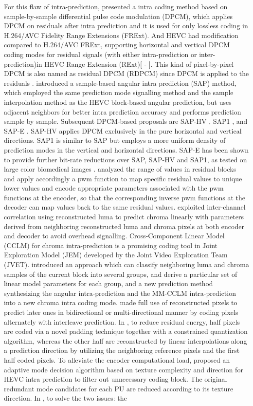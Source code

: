 \documentclass[journal]{IEEEtran}
\begin{document}
For this flaw of intra-prediction, \cite{d} presented a intra coding method based on sample-by-sample differential pulse code modulation (DPCM), which applies DPCM on residuals after intra prediction and it is used for only lossless coding in H.264/AVC Fidelity Range Extensions (FRExt). And HEVC had modification compared to H.264/AVC FRExt, supporting horizontal and vertical DPCM coding modes for residual signals (with either intra-prediction or inter-prediction)in HEVC Range Extension (RExt)[\cite{e} - \cite{h}]. This kind of pixel-by-pixel DPCM is also named as residual DPCM (RDPCM) since DPCM is applied to the residuals \cite{i}.
 \cite{09} introduced a sample-based angular intra prediction (SAP) method, which employed the same prediction mode signalling method and the sample interpolation method as the HEVC block-based angular prediction, but uses adjacent neighbors for better intra prediction accuracy and performs prediction sample by sample. Subsequent DPCM-based proposals are SAP-HV \cite{10}, SAP1 \cite{11}, and SAP-E \cite{12}. SAP-HV applies DPCM exclusively in the pure horizontal and vertical directions. SAP1 is similar to SAP but employs a more uniform density of prediction modes in the vertical and horizontal directions. SAP-E has been shown to provide further bit-rate reductions over SAP, SAP-HV and SAP1, as tested on large color biomedical images \cite{12}. \cite{13} analyzed the range of values in residual blocks and apply accordingly a pwm function to map specific residual values to unique lower values and encode appropriate parameters associated with the pwm functions at the encoder, so that the corresponding inverse pwm functions at the decoder can map values back to the same residual values. \cite{14} exploited inter-channel correlation using reconstructed luma to predict chroma linearly with parameters derived from neighboring reconstructed luma and chroma pixels at both encoder and decoder to avoid overhead signalling. Cross-Component Linear Model (CCLM) for chroma intra-prediction is a promising coding tool in Joint Exploration Model (JEM) developed by the Joint Video Exploration Team (JVET). \cite{15} introduced an approach which can classify neighboring luma and chroma samples of the current block into several groups, and derive a particular set of linear model parameters for each group, and a new prediction method synthesizing the angular intra-prediction and the MM-CCLM intra-prediction into a new chroma intra coding mode. \cite{16} made full use of reconstructed pixels to predict later ones in bidirectional or multi-directional manner by coding pixels alternately with interleave prediction. In \cite{17}, to reduce residual energy, half pixels are coded via a novel padding technique together with a constrained quantization algorithm, whereas the other half are reconstructed by linear interpolations along a prediction direction by utilizing the neighboring reference pixels and the first half coded pixels. To alleviate the encoder computational load, \cite{18} proposed an adaptive mode decision algorithm based on texture complexity and direction for HEVC intra prediction to filter out unnecessary coding block. The original redundant mode candidates for each PU are reduced according to its texture direction. In \cite{19}, to solve the two issues: the 
\end{document}
